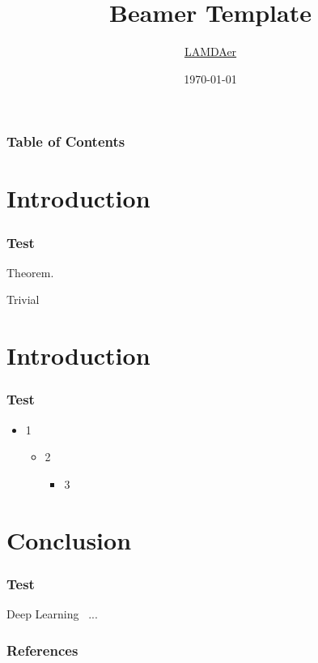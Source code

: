 \documentclass[aspectratio=169]{beamer}
\title{Beamer Template}
\author{\href{mailto:}{LAMDAer}}
\institute{LAMDA, Nanjing University}
\date{\today}
\begin{document}
\frame{\titlepage}


\begin{frame}
\frametitle{Table of Contents}
\tableofcontents[hidesubsections]
\end{frame}

\section{Introduction}
\begin{frame}
\frametitle{Test}

\begin{block}{Theorem. }

Trivial

\end{block}


\end{frame}

\section{Introduction}
\begin{frame}
\frametitle{Test}

\begin{itemize}
    \item 1
    \begin{itemize}
        \item 2
        \begin{itemize}
            \item 3
        \end{itemize}
    \end{itemize}
\end{itemize}

\end{frame}

\section{Conclusion}
\begin{frame}
\frametitle{Test}

Deep Learning~\cite{lecun2015deep} ...

\end{frame}


\begin{frame}
\frametitle{References}
\printbibliography
\end{frame}
\end{document}
